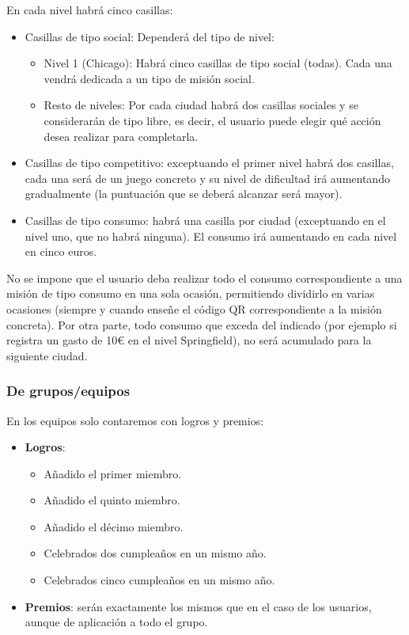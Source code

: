 \documentclass[twoside]{report}
\begin{document}
En cada nivel habrá cinco casillas:
\begin{itemize}
    \item Casillas de tipo social: Dependerá del tipo de nivel:
    \begin{itemize}
        \item Nivel 1 (Chicago): Habrá cinco casillas de tipo social (todas). Cada una vendrá dedicada a un tipo de misión social.
        \item Resto de niveles: Por cada ciudad habrá dos casillas sociales y se considerarán de tipo libre, es decir, el usuario puede elegir qué acción desea realizar para completarla.
    \end{itemize}
    \item Casillas de tipo competitivo: exceptuando el primer nivel habrá dos casillas, cada una será de un juego concreto y su nivel de dificultad irá aumentando gradualmente (la puntuación que se deberá alcanzar será mayor).
    \item Casillas de tipo consumo: habrá una casilla por ciudad (exceptuando en el nivel uno, que no habrá ninguna). El consumo irá aumentando en cada nivel en cinco euros.
\end{itemize}

No se impone que el usuario deba realizar todo el consumo correspondiente a una misión de tipo consumo en una sola ocasión, permitiendo dividirlo en varias ocasiones (siempre y cuando enseñe el código QR correspondiente a la misión concreta). Por otra parte, todo consumo que exceda del indicado (por ejemplo si registra un gasto de 10\euro \vspace{0.1cm} en el nivel Springfield), no será acumulado para la siguiente ciudad.

\subsubsection{De grupos/equipos}

En los equipos solo contaremos con logros y premios:
\begin{itemize}
	\item \textbf{Logros}:
		\begin{itemize}
		\item Añadido el primer miembro.
		\item Añadido el quinto miembro.
		\item Añadido el décimo miembro.
		\item Celebrados dos cumpleaños en un mismo año.
		\item Celebrados cinco cumpleaños en un mismo año.
		\end{itemize}
	\item \textbf{Premios}: serán exactamente los mismos que en el caso de los usuarios, aunque de aplicación a todo el grupo.
\end{itemize}
\end{document}
